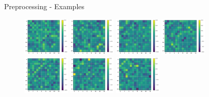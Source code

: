 \documentclass{beamer}
\begin{document}
\begin{frame}{Preprocessing - Examples}

    \begin{figure}[H]
        \centering
        \includegraphics[width=0.2\textwidth]{../Analysis/DFC/size=480_step=180_rho=0.1/node=15_id=100206/c_0.jpg}
        \includegraphics[width=0.2\textwidth]{../Analysis/DFC/size=480_step=180_rho=0.1/node=15_id=100206/c_2.jpg}
        \includegraphics[width=0.2\textwidth]{../Analysis/DFC/size=480_step=180_rho=0.1/node=15_id=100206/c_4.jpg}
        \includegraphics[width=0.2\textwidth]{../Analysis/DFC/size=480_step=180_rho=0.1/node=15_id=100206/c_6.jpg} \\
        \includegraphics[width=0.2\textwidth]{../Analysis/DFC/size=480_step=180_rho=0.1/node=15_id=100206/c_8.jpg}
        \includegraphics[width=0.2\textwidth]{../Analysis/DFC/size=480_step=180_rho=0.1/node=15_id=100206/c_10.jpg}
        \includegraphics[width=0.2\textwidth]{../Analysis/DFC/size=480_step=180_rho=0.1/node=15_id=100206/c_12.jpg}

\end{figure}
\end{frame}
\end{document}

